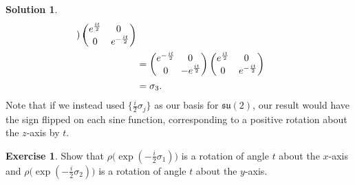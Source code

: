 \documentclass[11pt, a4paper]{report}
\theoremstyle{definition}
\newtheorem{exercise}{Exercise}[part]
\newtheorem{solution}{Solution}[part]
\newenvironment{ex}{\begin{exercise}}{\end{exercise}\pagebreak[1]}
\newenvironment{sol}{\begin{solution}}{\end{solution}\pagebreak[3]}
\newcommand*{\m}{\ensuremath\:\, \mathllap{-}}
\begin{document}
\begin{sol}
\begin{align*}
\begin{pmatrix*}[r]
            \end{pmatrix*}
            \begin{pmatrix}
                e^{\frac{it}{2}} & \!\!0 \\
                0                & e^{- \frac{it}{2}}
            \end{pmatrix} \\
        &= \begin{pmatrix}
                e^{-\frac{it}{2}} & 0 \,\,\, \\
                0                 & \m e^{\frac{it}{2}}
            \end{pmatrix}
            \begin{pmatrix}
                e^{\frac{it}{2}} & \!\!0 \\
                0                & e^{- \frac{it}{2}}
            \end{pmatrix} \\
        &= \sigma_3.
\end{align*}
Note that if we instead used $\{\frac{i}{2} \sigma_j\}$ as our basis for $\mathfrak{su}(2)$, our result would have the sign flipped on each sine function, corresponding to a positive rotation about the $z$-axis by $t$.

\end{sol}

\begin{ex}

Show that $\rho \bigl( \exp(-\frac{i}{2} \sigma_1) \bigr)$ is a rotation of angle $t$ about the $x$-axis and $\rho \bigl( \exp(-\frac{i}{2} \sigma_2) \bigr)$ is a rotation of angle $t$ about the $y$-axis.

\end{ex}
\end{document}
